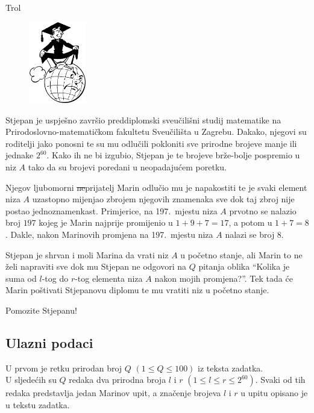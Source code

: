 \begin{statement}[
  problempoints=50,
  timelimit=1 sekunda,
  memorylimit=512 MiB,
]{Trol}

\setlength\intextsep{-0.1cm}
\begin{figure}
\centering
\includegraphics[width=0.22\textwidth]{img/diploma.png}
\end{figure}

Stjepan je uspješno završio preddiplomski sveučilišni studij matematike na
Prirodoslovno-matematičkom fakultetu Sveučilišta u Zagrebu. Dakako, njegovi su
roditelji jako ponosni te su mu odlučili pokloniti sve prirodne brojeve manje
ili jednake $2^{60}$. Kako ih ne bi izgubio, Stjepan je te brojeve brže-bolje
pospremio u niz $A$ tako da su brojevi poredani u neopadajućem poretku.

Njegov ljubomorni \sout{ne}prijatelj Marin odlučio mu je napakostiti te je svaki
element niza $A$ uzastopno mijenjao zbrojem njegovih znamenaka sve dok taj zbroj
nije postao jednoznamenkast. Primjerice, na 197.\ mjestu niza $A$ prvotno se
nalazio broj $197$ kojeg je Marin najprije promijenio u $1+9+7=17$, a potom u
$1+7=8$. Dakle, nakon Marinovih promjena na 197.\ mjestu niza $A$ nalazi se broj
$8$.

Stjepan je shrvan i moli Marina da vrati niz $A$ u početno stanje, ali Marin to
ne želi napraviti sve dok mu Stjepan ne odgovori na $Q$ pitanja oblika
“Kolika je suma od $l$-tog do $r$-tog elementa niza $A$ nakon mojih promjena?”.
Tek tada će Marin poštivati Stjepanovu diplomu te mu vratiti niz u početno
stanje.

Pomozite Stjepanu!

\subsection*{Ulazni podaci}
U prvom je retku prirodan broj $Q$ $(1 \le Q \le 100)$ iz teksta zadatka. \\
U sljedećih su $Q$ redaka dva prirodna broja $l$ i $r$
$(1 \le l \le r \le 2^{60})$. Svaki od tih redaka predstavlja jedan Marinov
upit, a značenje brojeva $l$ i $r$ u upitu opisano je u tekstu zadatka.


\end{statement}
